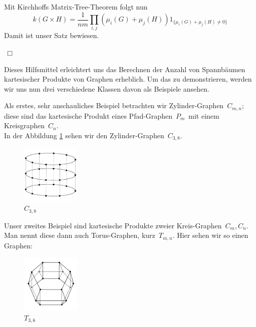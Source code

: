 Mit Kirchhoffs Matrix-Tree-Theorem folgt nun
\begin{equation}
 \mathit{k}(G \times H) = \frac{1}{nm}\displaystyle\prod_{i,j}(\mu_i(G)+\mu_j(H))1_{\{\mu_i(G)+\mu_j(H)\neq0\}}
\end{equation}
Damit ist unser Satz bewiesen.
\begin{flushright} $\,\Box\,$ \end{flushright} 
Dieses Hilfsmittel erleichtert uns das Berechnen der Anzahl von Spannbäumen kartesischer Produkte von Graphen erheblich. Um das zu demonstrieren, werden wir uns nun drei verschiedene Klassen davon als Beispiele ansehen.

\begin{Bsps}
\end{Bsps}
Als erstes, sehr anschauliches Beispiel betrachten wir Zylinder-Graphen $\,C_{m,n}$;
diese sind das kartesische Produkt eines Pfad-Graphen $\,P_m\,$ mit einem Kreisgraphen $\,C_n$.\; \\
In der Abbildung \ref{c8xp3} sehen wir den Zylinder-Graphen $\,C_{3,8}$.\; 
\begin{figure}[H]
  \centering
 \includegraphics[width=0.25\textwidth]{c8xp3.png}
 \caption{$C_{3,8}$}
 \label{c8xp3} %
\end{figure}
\begin{Bsps}
\end{Bsps}
Unser zweites Beispiel sind kartesische Produkte zweier Kreis-Graphen $\,C_m,C_n$.\; \\
Man nennt diese dann auch Torus-Graphen, kurz $\,T_{m,n}$.\;  Hier sehen wir so einen Graphen:
\begin{figure}[H]
  \centering
 \includegraphics[width=0.25\textwidth]{C3xC6_4.png}
 \caption{$T_{3,6}$}
 \label{c3xc6} %
\end{figure}
